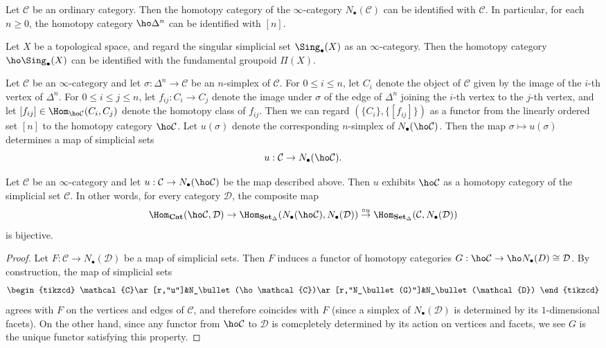 \begin{example}
Let $\mathcal{C}$ be an ordinary category. Then the homotopy category of the $\infty$-category $N_\bullet(\mathcal{C})$ can be identified with $\mathcal{C}$. In particular, for each $n\geq 0$, the homotopy category $\ho\Delta^n$ can be identified with $[n]$.
\end{example}
\begin{example}
Let $X$ be a topological space, and regard the singular simplicial set $\Sing_\bullet(X)$ as an $\infty$-category. Then the homotopy category $\ho\Sing_\bullet(X)$ can be identified with the fundamental groupoid $\Pi(X)$.
\end{example}
Let $\mathcal{C}$ be an $\infty$-category and let $\sigma:\Delta^n\to\mathcal{C}$ be an $n$-simplex of $\mathcal{C}$. For $0\leq i\leq n$, let $C_i$ denote the object of $\mathcal{C}$ given by the image of the $i$-th vertex of $\Delta^n$. For $0\leq i\leq j\leq n$, let $f_{ij}:C_i\to C_j$ denote the image under $\sigma$ of the edge of $\Delta^n$ joining the $i$-th vertex to the $j$-th vertex, and let $[f_{ij}]\in\Hom_{\ho\mathcal{C}}(C_i,C_j)$ denote the homotopy class of $f_{ij}$. Then we can regard $(\{C_i\},\{[f_{ij}]\})$ as a functor from the linearly ordered set $[n]$ to the homotopy category $\ho\mathcal{C}$. Let $u(\sigma)$ denote the corresponding $n$-simplex of $N_\bullet(\ho\mathcal{C})$. Then the map $\sigma\mapsto u(\sigma)$ determines a map of simplicial sets
\[u:\mathcal{C}\to N_\bullet(\ho\mathcal{C}).\]
\begin{proposition}\label{simplicial set inf-cat homotopy cat is adjoint}
Let $\mathcal{C}$ be an $\infty$-category and let $u:\mathcal{C}\to N_\bullet(\ho\mathcal{C})$ be the map described above. Then $u$ exhibits $\ho\mathcal{C}$ as a homotopy category of the simplicial set $\mathcal{C}$. In other words, for every category $\mathcal{D}$, the composite map
\[\Hom_{\mathbf{Cat}}(\ho\mathcal{C},\mathcal{D})\to\Hom_{\mathbf{Set}_\Delta}(N_\bullet(\ho\mathcal{C}),N_\bullet(\mathcal{D}))\stackrel{\circ u}{\to}\Hom_{\mathbf{Set}_\Delta}(\mathcal{C},N_\bullet(\mathcal{D}))\]
is bijective.
\end{proposition}
\begin{proof}
Let $F:\mathcal{C}\to N_\bullet(\mathcal{D})$ be a map of simplicial sets. Then $F$ induces a functor of homotopy categories $G:\ho\mathcal{C}\to \ho N_\bullet(D)\cong\mathcal{D}$. By construction, the map of simplicial sets
\[\begin{tikzcd}
\mathcal{C}\ar[r,"u"]&N_\bullet(\ho\mathcal{C})\ar[r,"N_\bullet(G)"]&N_\bullet(\mathcal{D})
\end{tikzcd}\]
agrees with $F$ on the vertices and edges of $\mathcal{C}$, and therefore coincides with $F$ (since a simplex of $N_\bullet(\mathcal{D})$ is determined by its $1$-dimensional facets). On the other hand, since any functor from $\ho\mathcal{C}$ to $\mathcal{D}$ is comcpletely determined by its action on vertices and facets, we see $G$ is the unique functor satisfying this property. 
\end{proof}
